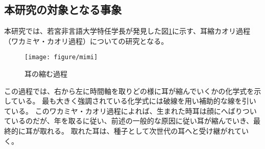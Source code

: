 \documentclass[12pt]{jsarticle}
\begin{document}
\subsection{本研究の対象となる事象}
本研究では、若宮非言語大学特任学長が発見した図\ref{mimi}に示す、耳縮カオリ過程（ワカミヤ・カオリ過程）についての研究となる。
\begin{figure}
\centering
\texttt{[image: figure/mimi]}
\caption{耳の縮む過程}
\label{mimi}
\end{figure}
この過程では、右から左に時間軸を取りどの様に耳が縮んでいくかの化学式を示している。
最も大きく強調されている化学式には破線を用い補助的な線を引いている。
このワカミヤ・カオリ過程によれば、生まれた時耳は顔にへばりついているのだが、年を取るに従い、前述の一般的な原因に従い耳が縮んでいき、最終的に耳が取れる。
取れた耳は、種子として次世代の耳へと受け継がれていく。
\end{document}
